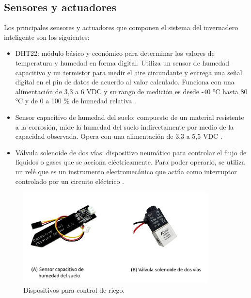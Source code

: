 \subsection{Sensores y actuadores}
\label{sec:Sensores y actuadores}
Los principales sensores y actuadores que componen el sistema del invernadero inteligente son los siguientes:
\begin{itemize}

\item DHT22: módulo básico y económico para determinar los valores de temperatura y humedad en forma digital. Utiliza un sensor de humedad capacitivo y un termistor para medir el aire circundante y entrega una señal digital en el pin de datos de acuerdo al valor calculado. Funciona con una alimentación de 3,3 a 6 VDC y su rango de medición es desde -40 °C hasta 80 °C y de 0 a 100 \% de humedad relativa \citep{dht22}.

\item Sensor capacitivo de humedad del suelo: compuesto de un material resistente a la corrosión, mide la humedad del suelo indirectamente por medio de la capacidad observada. Opera con una alimentación de 3,3 a 5,5 VDC \citep{soilsensor}.

\item Válvula solenoide de dos vías: dispositivo neumático para controlar el flujo de líquidos o gases que se acciona eléctricamente. Para poder operarlo, se utiliza un relé que es un instrumento electromecánico que actúa como interruptor controlado por un circuito eléctrico \citep{valve}\citep{rele}.

\end{itemize}
\begin{figure}[h]
	\centering
	\includegraphics[width=0.90\textwidth]{./Figures/riego.jpg}
	\caption[Dispositivos para control de riego.]{Dispositivos para control de riego.}
	\label{fig:riego}

\end{figure}






